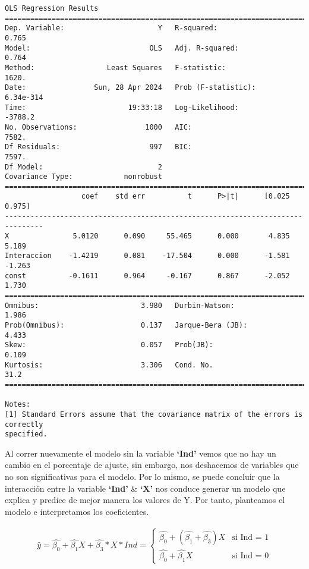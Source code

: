 \documentclass[11pt]{article}
\begin{document}
    \begin{Verbatim}[commandchars=\\\{\}]
                            OLS Regression Results
==============================================================================
Dep. Variable:                      Y   R-squared:                       0.765
Model:                            OLS   Adj. R-squared:                  0.764
Method:                 Least Squares   F-statistic:                     1620.
Date:                Sun, 28 Apr 2024   Prob (F-statistic):          6.34e-314
Time:                        19:33:18   Log-Likelihood:                -3788.2
No. Observations:                1000   AIC:                             7582.
Df Residuals:                     997   BIC:                             7597.
Df Model:                           2
Covariance Type:            nonrobust
===============================================================================
                  coef    std err          t      P>|t|      [0.025      0.975]
-------------------------------------------------------------------------------
X               5.0120      0.090     55.465      0.000       4.835       5.189
Interaccion    -1.4219      0.081    -17.504      0.000      -1.581      -1.263
const          -0.1611      0.964     -0.167      0.867      -2.052       1.730
==============================================================================
Omnibus:                        3.980   Durbin-Watson:                   1.986
Prob(Omnibus):                  0.137   Jarque-Bera (JB):                4.433
Skew:                           0.057   Prob(JB):                        0.109
Kurtosis:                       3.306   Cond. No.                         31.2
==============================================================================

Notes:
[1] Standard Errors assume that the covariance matrix of the errors is correctly
specified.
    \end{Verbatim}

    Al correr nuevamente el modelo sin la variable \textbf{`Ind'} vemos que
no hay un cambio en el porcentaje de ajuste, sin embargo, nos deshacemos
de variables que no son significativas para el modelo. Por lo mismo, se
puede concluir que la interacción entre la variable \textbf{`Ind'} \&
\textbf{`X'} nos conduce generar un modelo que explica y predice de
mejor manera los valores de Y. Por tanto, planteamos el modelo e
interpretamos los coeficientes.

\[ \begin{align} 
\hat{y} = \hat{\beta_0} + \hat{\beta_1}X + \hat{\beta_3}*X*Ind = \left\{ 
    \begin{array}{ll} \hat{\beta_0}+ (\hat{\beta_1} + \hat{\beta_3})X & \text{si  Ind = 1} \\ 
    \hat{\beta_0} + \hat{\beta_1}X & \text {si  Ind = 0} \end{array} \right. \end{align} \]
\end{document}
